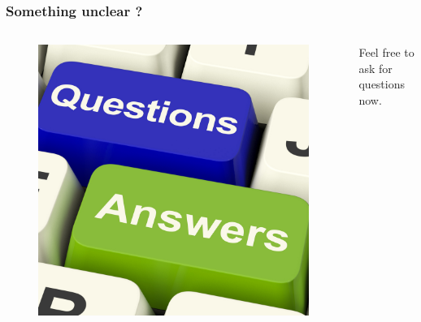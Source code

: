 \begin{frame}
\frametitle{Something unclear ?}
\begin{columns}[c]
\begin{figure}
\includegraphics[width=0.8\linewidth]{./materials/questions.jpg}
\end{figure}
Feel free to ask for questions now.
\end{columns}
\end{frame}

